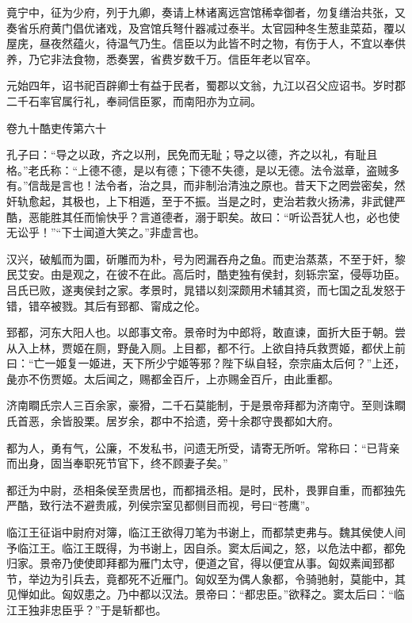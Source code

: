 \documentclass[12pt,UTF8]{ctexbook}
\begin{document}
竟宁中，征为少府，列于九卿，奏请上林诸离远宫馆稀幸御者，勿复缮治共张，又奏省乐府黄门倡优诸戏，及宫馆兵弩什器减过泰半。太官园种冬生葱韭菜茹，覆以屋庑，昼夜然蕴火，待温气乃生。信臣以为此皆不时之物，有伤于人，不宜以奉供养，乃它非法食物，悉奏罢，省费岁数千万。信臣年老以官卒。



元始四年，诏书祀百辟卿士有益于民者，蜀郡以文翁，九江以召父应诏书。岁时郡二千石率官属行礼，奉祠信臣冢，而南阳亦为立祠。





卷九十酷吏传第六十



孔子曰：“导之以政，齐之以刑，民免而无耻；导之以德，齐之以礼，有耻且格。”老氏称：“上德不德，是以有德；下德不失德，是以无德。法令滋章，盗贼多有。”信哉是言也！法令者，治之具，而非制治清浊之原也。昔天下之罔尝密矣，然奸轨愈起，其极也，上下相遁，至于不振。当是之时，吏治若救火扬沸，非武健严酷，恶能胜其任而愉快乎？言道德者，溺于职矣。故曰：“听讼吾犹人也，必也使无讼乎！”“下士闻道大笑之。”非虚言也。



汉兴，破觚而为圜，斫雕而为朴，号为罔漏吞舟之鱼。而吏治蒸蒸，不至于奸，黎民艾安。由是观之，在彼不在此。高后时，酷吏独有侯封，刻轹宗室，侵辱功臣。吕氏已败，遂夷侯封之家。孝景时，晁错以刻深颇用术辅其资，而七国之乱发怒于错，错卒被戮。其后有郅都、甯成之伦。



郅都，河东大阳人也。以郎事文帝。景帝时为中郎将，敢直谏，面折大臣于朝。尝从入上林，贾姬在厕，野彘入厕。上目都，都不行。上欲自持兵救贾姬，都伏上前曰：“亡一姬复一姬进，天下所少宁姬等邪？陛下纵自轻，奈宗庙太后何？”上还，彘亦不伤贾姬。太后闻之，赐都金百斤，上亦赐金百斤，由此重都。



济南瞷氏宗人三百余家，豪猾，二千石莫能制，于是景帝拜都为济南守。至则诛瞷氏首恶，余皆股栗。居岁余，郡中不拾遗，旁十余郡守畏都如大府。



都为人，勇有气，公廉，不发私书，问遗无所受，请寄无所听。常称曰：“已背亲而出身，固当奉职死节官下，终不顾妻子矣。”



都迁为中尉，丞相条侯至贵居也，而都揖丞相。是时，民朴，畏罪自重，而都独先严酷，致行法不避贵戚，列侯宗室见都侧目而视，号曰“苍鹰”。



临江王征诣中尉府对簿，临江王欲得刀笔为书谢上，而都禁吏弗与。魏其侯使人间予临江王。临江王既得，为书谢上，因自杀。窦太后闻之，怒，以危法中都，都免归家。景帝乃使使即拜都为雁门太守，便道之官，得以便宜从事。匈奴素闻郅都节，举边为引兵去，竟都死不近雁门。匈奴至为偶人象都，令骑驰射，莫能中，其见惮如此。匈奴患之。乃中都以汉法。景帝曰：“都忠臣。”欲释之。窦太后曰：“临江王独非忠臣乎？”于是斩都也。
\end{document}
